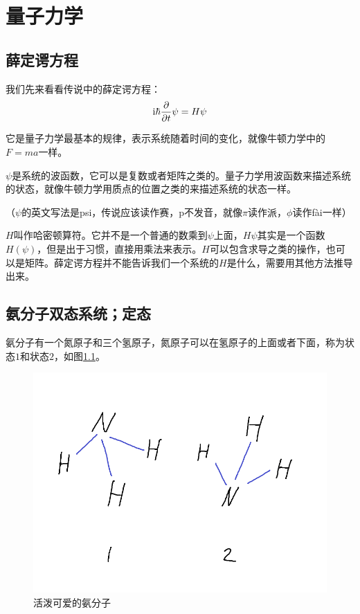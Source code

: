 \chapter{量子力学}
\section{薛定谔方程}
我们先来看看传说中的薛定谔方程：
\begin{equation*}
\mathrm{i} \hbar \frac{\partial}{\partial t} \psi=H \psi
\end{equation*}

它是量子力学最基本的规律，表示系统随着时间的变化，就像牛顿力学中的$F=m a$一样。

$\psi$是系统的波函数，它可以是复数或者矩阵之类的。量子力学用波函数来描述系统的状态，就像牛顿力学用质点的位置之类的来描述系统的状态一样。

（$\psi$的英文写法是psi，传说应该读作赛，p不发音，就像$\pi$读作派，$\phi$读作fài一样）

$H$叫作哈密顿算符。它并不是一个普通的数乘到$\psi$上面，$H \psi$其实是一个函数$H(\psi)$，但是出于习惯，直接用乘法来表示。$H$可以包含求导之类的操作，也可以是矩阵。薛定谔方程并不能告诉我们一个系统的$H$是什么，需要用其他方法推导出来。
\section{氨分子双态系统；定态}
氨分子有一个氮原子和三个氢原子，氮原子可以在氢原子的上面或者下面，称为状态$1$和状态$2$，如图\ref{fig-ammonia}。
\begin{figure}[htb]
\centering
\includegraphics[scale=0.5]{fig/ammonia}
\caption{活泼可爱的氨分子}
\label{fig-ammonia}
\end{figure}

